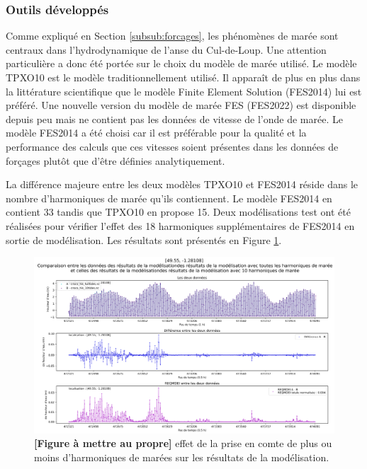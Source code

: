 \documentclass[10pt,a4paper,titlepage]{article}
\begin{document}
    
    
    \subsubsection{Outils développés}
    
    Comme expliqué en Section \ref{subsub:forcages}, les phénomènes de marée sont centraux dans l'hydrodynamique de l'anse du Cul-de-Loup.
    Une attention particulière a donc été portée sur le choix du modèle de marée utilisé.
    Le modèle TPXO10 est le modèle traditionnellement utilisé.
    Il apparaît de plus en plus dans la littérature scientifique que le modèle Finite Element Solution (FES2014) lui est préféré.
    Une nouvelle version du modèle de marée FES (FES2022) est disponible depuis peu mais ne contient pas les données de vitesse de l'onde de marée.
    Le modèle FES2014 a été choisi car il est préférable pour la qualité et la performance des calculs que ces vitesses soient présentes dans les données de forçages plutôt que d'être définies analytiquement.
    
    La différence majeure entre les deux modèles TPXO10 et FES2014 réside dans le nombre d'harmoniques de marée qu'ils contiennent.
    Le modèle FES2014 en contient 33 tandis que TPXO10 en propose 15.
    Deux modélisations test ont été réalisées pour vérifier l'effet des 18 harmoniques supplémentaires de FES2014 en sortie de modélisation.
    Les résultats sont présentés en Figure \ref{fig:comp_harmoniques_10_ou_33}.
    
    \begin{figure}[h!]
        \centering
        \includegraphics[scale=0.3]{../images/[49.55, -1.28108]_full_tide_VS_10_tide.png}
        \caption{
            \textbf{[Figure à mettre au propre]}
            effet de la prise en comte de plus ou moins d'harmoniques de marées sur les résultats de la modélisation.
        }
        \label{fig:comp_harmoniques_10_ou_33}
    \end{figure}
    
\end{document}
